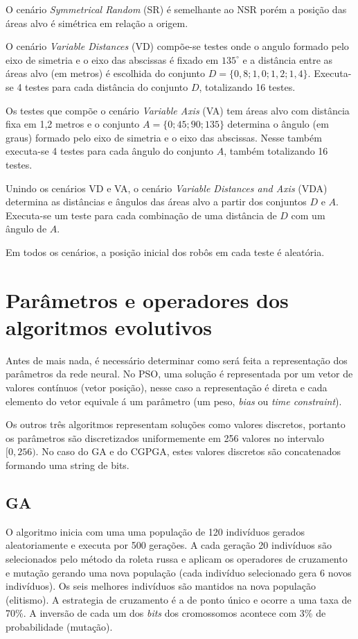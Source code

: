 O cenário \textit{Symmetrical Random} (SR) é semelhante ao NSR porém a posição das áreas alvo é simétrica em relação a origem.

O cenário \textit{Variable Distances} (VD) compõe-se testes onde o angulo formado pelo eixo de simetria e o eixo das abscissas é fixado em $135^{\circ}$ e a distância entre as áreas alvo (em metros) é escolhida do conjunto $D = \{0,8; 1,0; 1,2; 1,4\}$. Executa-se 4 testes para cada distância do conjunto $D$, totalizando 16 testes.

Os testes que compõe o cenário \textit{Variable Axis} (VA) tem áreas alvo com distância fixa em 1,2 metros e o conjunto $A = \{0; 45; 90; 135\}$ determina o ângulo (em graus) formado pelo eixo de simetria e o eixo das abscissas. Nesse também executa-se 4 testes para cada ângulo do conjunto $A$, também totalizando 16 testes.

Unindo os cenários VD e VA, o cenário \textit{Variable Distances and Axis} (VDA) determina as distâncias e ângulos das áreas alvo a partir dos conjuntos $D$ e $A$. Executa-se um teste para cada combinação de uma distância de $D$ com um ângulo de $A$.

Em todos os cenários, a posição inicial dos robôs em cada teste é aleatória.

\section{Parâmetros e operadores dos algoritmos evolutivos}
\label{sec:exp-evo-algorithms}

Antes de mais nada, é necessário determinar como será feita a representação dos parâmetros da rede neural. No PSO, uma solução é representada por um vetor de valores contínuos (vetor posição), nesse caso a representação é direta e cada elemento do vetor equivale á um parâmetro (um peso, \textit{bias} ou \textit{time constraint}).

Os outros três algoritmos representam soluções como valores discretos, portanto os parâmetros são discretizados uniformemente em 256 valores no intervalo $[0, 256)$. No caso do GA e do CGPGA, estes valores discretos são concatenados formando uma string de bits.

\subsection{GA}

O algoritmo inicia com uma uma população de 120 indivíduos gerados aleatoriamente e executa por 500 gerações. A cada geração 20 indivíduos são selecionados pelo método da roleta russa e aplicam os operadores de cruzamento e mutação gerando uma nova população (cada indivíduo selecionado gera 6 novos indivíduos). Os seis melhores indivíduos são mantidos na nova população (elitismo). A estrategia de cruzamento é a de ponto único e ocorre a uma taxa de 70\%. A inversão de cada um dos \textit{bits} dos cromossomos acontece com 3\% de probabilidade (mutação).

